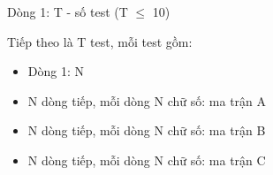 Dòng 1: T - số test (T  $\le$  10)

Tiếp theo là T test, mỗi test gồm:
\begin{itemize}
	\item Dòng 1: N
	\item N dòng tiếp, mỗi dòng N chữ số: ma trận A
	\item N dòng tiếp, mỗi dòng N chữ số: ma trận B
	\item N dòng tiếp, mỗi dòng N chữ số: ma trận C
\end{itemize}